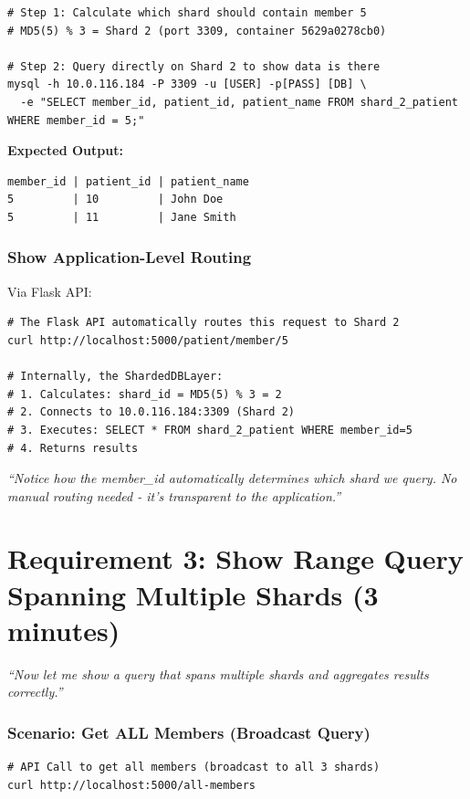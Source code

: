 \documentclass[12pt]{article}
\begin{document}
\begin{lstlisting}
# Step 1: Calculate which shard should contain member 5
# MD5(5) % 3 = Shard 2 (port 3309, container 5629a0278cb0)

# Step 2: Query directly on Shard 2 to show data is there
mysql -h 10.0.116.184 -P 3309 -u [USER] -p[PASS] [DB] \
  -e "SELECT member_id, patient_id, patient_name FROM shard_2_patient WHERE member_id = 5;"
\end{lstlisting}

\textbf{Expected Output:}
\begin{lstlisting}
member_id | patient_id | patient_name
5         | 10         | John Doe
5         | 11         | Jane Smith
\end{lstlisting}

\subsubsection*{Show Application-Level Routing}

Via Flask API:

\begin{lstlisting}
# The Flask API automatically routes this request to Shard 2
curl http://localhost:5000/patient/member/5

# Internally, the ShardedDBLayer:
# 1. Calculates: shard_id = MD5(5) % 3 = 2
# 2. Connects to 10.0.116.184:3309 (Shard 2)
# 3. Executes: SELECT * FROM shard_2_patient WHERE member_id=5
# 4. Returns results
\end{lstlisting}

\textit{``Notice how the member_id automatically determines which shard we query. No manual routing needed - it's transparent to the application.''}

\newpage

\section{Requirement 3: Show Range Query Spanning Multiple Shards (3 minutes)}

\textit{``Now let me show a query that spans multiple shards and aggregates results correctly.''}

\subsubsection*{Scenario: Get ALL Members (Broadcast Query)}

\begin{lstlisting}
# API Call to get all members (broadcast to all 3 shards)
curl http://localhost:5000/all-members
\end{lstlisting}
\end{document}
